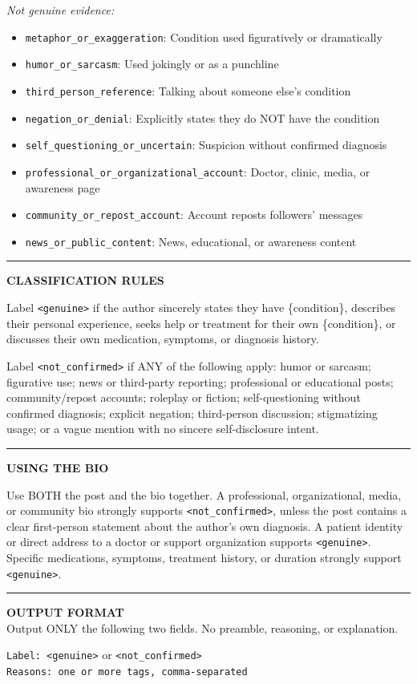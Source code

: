 \documentclass[11pt]{article}
\begin{document}
\begin{tcolorbox}
\textit{Not genuine evidence:}
\begin{itemize}
  \item \texttt{metaphor\_or\_exaggeration}: Condition used figuratively or dramatically
  \item \texttt{humor\_or\_sarcasm}: Used jokingly or as a punchline
  \item \texttt{third\_person\_reference}: Talking about someone else's condition
  \item \texttt{negation\_or\_denial}: Explicitly states they do NOT have the condition
  \item \texttt{self\_questioning\_or\_uncertain}: Suspicion without confirmed diagnosis
  \item \texttt{professional\_or\_organizational\_account}: Doctor, clinic, media, or awareness page
  \item \texttt{community\_or\_repost\_account}: Account reposts followers' messages
  \item \texttt{news\_or\_public\_content}: News, educational, or awareness content
\end{itemize}

\medskip\hrule\medskip

\textbf{CLASSIFICATION RULES}

Label \texttt{<genuine>} if the author sincerely states they have \{condition\}, describes their personal experience, seeks help or treatment for their own \{condition\}, or discusses their own medication, symptoms, or diagnosis history.


Label \texttt{<not\_confirmed>} if ANY of the following apply: humor or sarcasm; figurative use; news or third-party reporting; professional or educational posts; community/repost accounts; roleplay or fiction; self-questioning without confirmed diagnosis; explicit negation; third-person discussion; stigmatizing usage; or a vague mention with no sincere self-disclosure intent.

\medskip\hrule\medskip

\textbf{USING THE BIO}

Use BOTH the post and the bio together. A professional, organizational, media, or community bio strongly supports \texttt{<not\_confirmed>}, unless the post contains a clear first-person statement about the author's own diagnosis. A patient identity or direct address to a doctor or support organization supports \texttt{<genuine>}. Specific medications, symptoms, treatment history, or duration strongly support \texttt{<genuine>}.

\medskip\hrule\medskip

\textbf{OUTPUT FORMAT}\\
Output ONLY the following two fields. No preamble, reasoning, or explanation.

\medskip
\texttt{Label: <genuine>} or \texttt{<not\_confirmed>}\\
\texttt{Reasons: one or more tags, comma-separated}
\end{tcolorbox}
\end{document}
